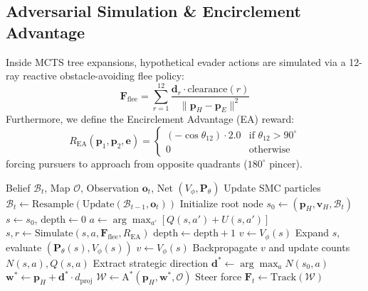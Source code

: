 \documentclass[conference]{IEEEtran}
\begin{document}
\subsection{Adversarial Simulation & Encirclement Advantage}
Inside MCTS tree expansions, hypothetical evader actions are simulated via a 12-ray reactive obstacle-avoiding flee policy:
\begin{equation}
    \mathbf{F}_{\text{flee}} = \sum_{r=1}^{12} \frac{\mathbf{d}_r \cdot \text{clearance}(r)}{\|\mathbf{p}_H - \mathbf{p}_E\|^2}
\end{equation}
Furthermore, we define the Encirclement Advantage (EA) reward:
\begin{equation}
    R_{\text{EA}}(\mathbf{p}_1, \mathbf{p}_2, \mathbf{e}) = \begin{cases} (-\cos \theta_{12}) \cdot 2.0 & \text{if } \theta_{12} > 90^\circ \\ 0 & \text{otherwise} \end{cases}
\end{equation}
forcing pursuers to approach from opposite quadrants ($180^\circ$ pincer).

\begin{algorithm}[t]
\caption{Deep-POMCP Online Planning Loop}
\label{alg:deep_pomcp}
\begin{algorithmic}[1]
\REQUIRE Belief $\mathcal{B}_t$, Map $\mathcal{O}$, Observation $\mathbf{o}_t$, Net $(V_\phi, \mathbf{P}_\theta)$
\STATE Update SMC particles $\mathcal{B}_t \gets \text{Resample}(\text{Update}(\mathcal{B}_{t-1}, \mathbf{o}_t))$
\STATE Initialize root node $s_0 \gets (\mathbf{p}_H, \mathbf{v}_H, \mathcal{B}_t)$
    \STATE $s \gets s_0$, $\text{depth} \gets 0$
        \STATE $a \gets \arg\max_{a'} [Q(s, a') + U(s, a')]$
        \STATE $s, r \gets \text{Simulate}(s, a, \mathbf{F}_{\text{flee}}, R_{\text{EA}})$
        \STATE $\text{depth} \gets \text{depth} + 1$
    \ENDWHILE
        \STATE $v \gets V_\phi(s)$
    \ELSE
        \STATE Expand $s$, evaluate $(\mathbf{P}_\theta(s), V_\phi(s))$
        \STATE $v \gets V_\phi(s)$
    \ENDIF
    \STATE Backpropagate $v$ and update counts $N(s, a), Q(s, a)$
\ENDFOR
\STATE Extract strategic direction $\mathbf{d}^* \gets \arg\max_a N(s_0, a)$
\STATE $\mathbf{w}^* \gets \mathbf{p}_H + \mathbf{d}^* \cdot d_{\text{proj}}$
\STATE $\mathcal{W} \gets \text{A}^*(\mathbf{p}_H, \mathbf{w}^*, \mathcal{O})$
\RETURN Steer force $\mathbf{F}_t \gets \text{Track}(\mathcal{W})$
\end{algorithmic}
\end{algorithm}
\end{document}
